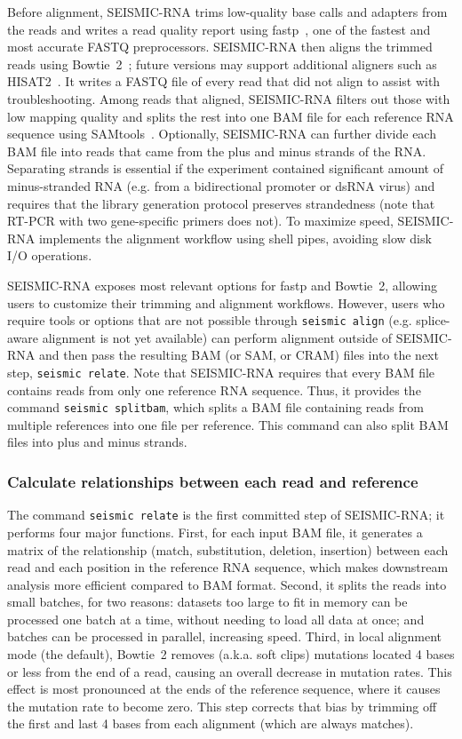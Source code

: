 \documentclass[11pt]{article}
\begin{document}
Before alignment, SEISMIC-RNA trims low-quality base calls and adapters from the reads and writes a read quality report using fastp~\cite{Chen2018}, one of the fastest and most accurate FASTQ preprocessors.
SEISMIC-RNA then aligns the trimmed reads using Bowtie~2~\cite{Langmead2012}; future versions may support additional aligners such as HISAT2~\cite{Kim2019}.
It writes a FASTQ file of every read that did not align to assist with troubleshooting.
Among reads that aligned, SEISMIC-RNA filters out those with low mapping quality and splits the rest into one BAM file for each reference RNA sequence using SAMtools~\cite{Danecek2021}.
Optionally, SEISMIC-RNA can further divide each BAM file into reads that came from the plus and minus strands of the RNA.
Separating strands is essential if the experiment contained significant amount of minus-stranded RNA (e.g. from a bidirectional promoter or dsRNA virus) and requires that the library generation protocol preserves strandedness (note that RT-PCR with two gene-specific primers does not).
To maximize speed, SEISMIC-RNA implements the alignment workflow using shell pipes, avoiding slow disk I/O operations.

SEISMIC-RNA exposes most relevant options for fastp and Bowtie~2, allowing users to customize their trimming and alignment workflows.
However, users who require tools or options that are not possible through \verb|seismic align| (e.g. splice-aware alignment is not yet available) can perform alignment outside of SEISMIC-RNA and then pass the resulting BAM (or SAM, or CRAM) files into the next step, \verb|seismic relate|.
Note that SEISMIC-RNA requires that every BAM file contains reads from only one reference RNA sequence.
Thus, it provides the command \verb|seismic splitbam|, which splits a BAM file containing reads from multiple references into one file per reference.
This command can also split BAM files into plus and minus strands.

\subsubsection{Calculate relationships between each read and reference}
\label{seismic-relate}

The command \verb|seismic relate| is the first committed step of SEISMIC-RNA; it performs four major functions.
First, for each input BAM file, it generates a matrix of the relationship (match, substitution, deletion, insertion) between each read and each position in the reference RNA sequence, which makes downstream analysis more efficient compared to BAM format.
Second, it splits the reads into small batches, for two reasons: datasets too large to fit in memory can be processed one batch at a time, without needing to load all data at once; and batches can be processed in parallel, increasing speed.
Third, in local alignment mode (the default), Bowtie~2 removes (a.k.a. soft clips) mutations located 4 bases or less from the end of a read, causing an overall decrease in mutation rates.
This effect is most pronounced at the ends of the reference sequence, where it causes the mutation rate to become zero.
This step corrects that bias by trimming off the first and last 4 bases from each alignment (which are always matches).
\end{document}
